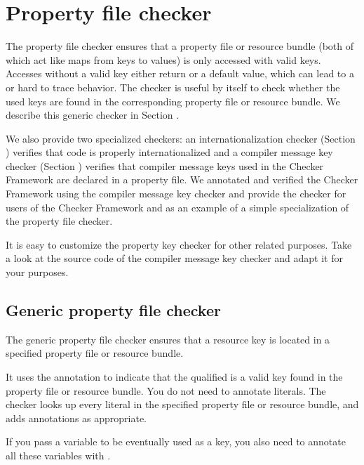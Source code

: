 \htmlhr
\chapter{Property file checker\label{propkey-checker}}

The property file checker ensures that a property file or resource bundle (both
of which act like maps from keys to values) is only accessed with valid keys.
Accesses without a valid key either return  or a default value, which
can lead to a  or hard to trace behavior. 
The checker is useful by itself to check whether the used keys are found in
the corresponding property file or resource bundle. We describe this generic checker
in Section .

We also provide two specialized checkers:
an internationalization checker (Section )
verifies that code is properly internationalized and
a compiler message key checker (Section )
verifies that compiler message keys used in the Checker Framework are
declared in a property file. We annotated and verified the Checker Framework
using the compiler message key checker and provide the checker for users of the
Checker Framework and as an example of a simple specialization of the property
file checker.

It is easy to customize the property key checker for other related purposes.
Take a look at the source code of the compiler message key checker and adapt it for
your purposes.



\section{Generic property file checker\label{genpropkey-checker}}

The generic property file checker ensures that a resource key is located
in a specified property file or resource bundle.


It uses the annotation 
to indicate that the qualified  is a valid key
found in the property file or resource bundle.
You do not need to annotate  literals.
The checker looks up every  literal in the specified
property file or resource bundle, and adds annotations as appropriate.

If you pass a  variable to be eventually used as a key, you
also need to annotate all these variables with .


